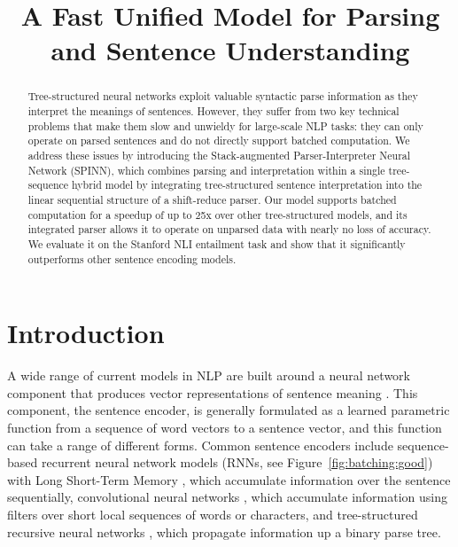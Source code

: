 \documentclass[11pt]{article}
\title{A Fast Unified Model for Parsing and Sentence Understanding}
\author{}
\date{}
\begin{document}
\maketitle
\begin{abstract}

Tree-structured neural networks exploit valuable syntactic parse information as they interpret the meanings of sentences. However, they suffer from two key technical problems that make them slow and unwieldy for large-scale NLP tasks: they can only operate on parsed sentences and do not directly support batched computation. We address these issues by introducing the Stack-augmented Parser-Interpreter Neural Network (SPINN), which combines parsing and interpretation within a single tree-sequence hybrid model by integrating tree-structured sentence interpretation into the linear sequential structure of a shift-reduce parser. Our model supports batched computation for a speedup of up to 25x over other tree-structured models, and its integrated parser allows it to operate on unparsed data with nearly no loss of accuracy. We evaluate it on the Stanford NLI entailment task and show that it significantly outperforms other sentence encoding models.
\end{abstract}

\section{Introduction}




A wide range of current models in NLP are built around a neural network component that produces vector representations of sentence meaning \citep{tai2015improved,sutskever2014sequence}. This component, the sentence encoder, is generally formulated as a learned parametric function from a sequence of word vectors to a sentence vector, and this function can take a range of different forms. Common sentence encoders include sequence-based recurrent neural network models (RNNs, see Figure~\ref{fig:batching:good}) with Long Short-Term Memory \citep[LSTM,][]{hochreiter1997long}, which accumulate information over the sentence sequentially, convolutional neural networks \citep{kalchbrenner2014convolutional,DBLP:journals/corr/ZhangZL15}, which accumulate information using filters over short local sequences of words or characters, and tree-structured recursive neural networks \citep[TreeRNNs,][see Figure~\ref{fig:batching:bad}]{goller1996learning,socher2011parsing}, which propagate information up a binary parse tree.
\end{document}
